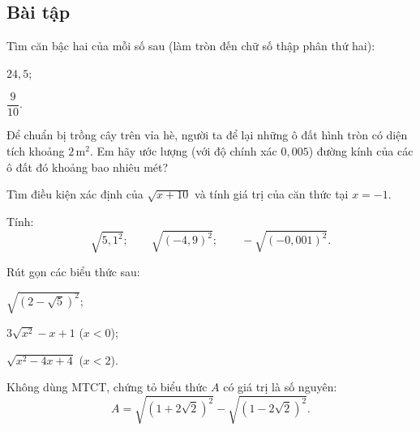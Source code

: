 \begin{exercises}
    \subsection{Bài tập}

    \begin{questions}[series=SGK]
        \item Tìm căn bậc hai của mỗi số sau (làm tròn đến chữ số thập phân thứ hai):
        \begin{questions}
            \item $24{,}5$;
            \item $\dfrac{9}{10}$.
        \end{questions}

        \answerline

        \item Để chuẩn bị trồng cây trên vỉa hè, người ta để lại những ô đất hình tròn có diện tích khoảng $2\,\text{m}^2$. Em hãy ước lượng (với độ chính xác $0{,}005$) đường kính của các ô đất đó khoảng bao nhiêu mét?

        \answerline
        \answerline

        \item Tìm điều kiện xác định của $\sqrt{x+10}$ và tính giá trị của căn thức tại $x=-1$.

        \answerline
        \answerline

        \item Tính:
        \[
            \sqrt{5{,}1^2};\qquad
            \sqrt{(-4{,}9)^2};\qquad
            -\sqrt{(-0{,}001)^2}.
        \]

        \answerline

        \item Rút gọn các biểu thức sau:
        \begin{questions}
            \item $\sqrt{(2-\sqrt{5})^2}$;
            \item $3\sqrt{x^2}-x+1$ ($x<0$);
            \item $\sqrt{x^2-4x+4}$ ($x<2$).
        \end{questions}

        \answerline
        \answerline

        \item Không dùng MTCT, chứng tỏ biểu thức $A$ có giá trị là số nguyên:
        \[
            A=\sqrt{(1+2\sqrt{2})^2}-\sqrt{(1-2\sqrt{2})^2}.
        \]

        \answerline
        \answerline
    \end{questions}
\end{exercises}

